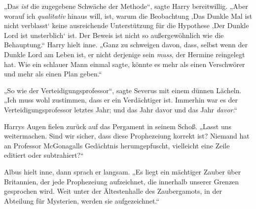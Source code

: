 „Das \emph{ist} die zugegebene Schwäche der Methode“, sagte Harry bereitwillig.
„Aber worauf ich \emph{qualitativ} hinaus will, ist, warum die Beobachtung ‚Das Dunkle Mal ist nicht verblasst‘ keine ausreichende Unterstützung für die Hypothese ‚Der Dunkle Lord ist unsterblich‘ ist. Der Beweis ist nicht so außergewöhnlich wie die Behauptung.“ Harry hielt inne.
„Ganz zu schweigen davon, dass, selbst wenn der Dunkle Lord am Leben ist, er nicht derjenige sein \emph{muss}, der Hermine reingelegt hat. Wie ein schlauer Mann einmal sagte, könnte es mehr als einen Verschwörer und mehr als einen Plan geben.“

„So wie der Verteidigungsprofessor“, sagte Severus mit einem dünnen Lächeln.
„Ich muss wohl zustimmen, dass er ein Verdächtiger ist. Immerhin war es der Verteidigungsprofessor letztes Jahr; und das Jahr davor und das Jahr \emph{davor}.“

Harrys Augen fielen zurück auf das Pergament in seinem Schoß.
„Lasst uns weitermachen. Sind wir sicher, dass diese Prophezeiung korrekt ist? Niemand hat an Professor McGonagalls Gedächtnis herumgepfuscht, vielleicht eine Zeile editiert oder subtrahiert?“

Albus hielt inne, dann sprach er langsam.
„Es liegt ein mächtiger Zauber über Britannien, der jede Prophezeiung aufzeichnet, die innerhalb unserer Grenzen gesprochen wird. Weit unter der Ältestenhalle des Zaubergamots, in der Abteilung für Mysterien, werden sie aufgezeichnet.“

